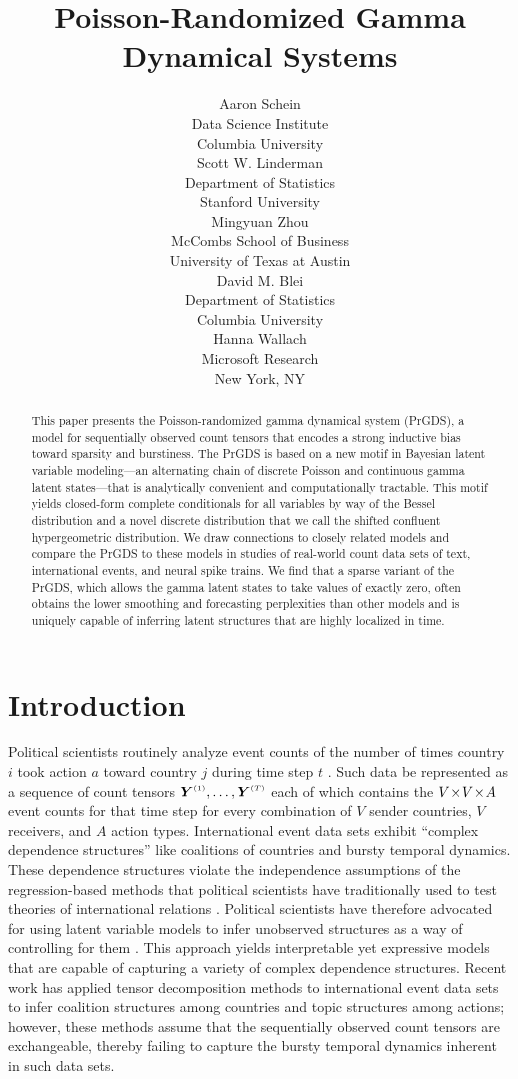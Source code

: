 \documentclass{article}
\title{Poisson-Randomized Gamma Dynamical Systems}
\author{%
  Aaron Schein \\
  Data Science Institute\\
  Columbia University\\
  \And
  Scott W. Linderman \\
  Department of Statistics\\
  Stanford University\\
  \AND
  Mingyuan Zhou \\
  McCombs School of Business\\
  University of Texas at Austin\\
  \And
  David M. Blei \\
  Department of Statistics\\
  Columbia University\\
  \And
  Hanna Wallach \\
  Microsoft Research\\
  New York, NY\\
}
\begin{document}
\maketitle

\begin{abstract}
This paper presents the Poisson-randomized gamma dynamical system (PrGDS), a model for sequentially observed count tensors that encodes a strong inductive bias toward sparsity and burstiness. The PrGDS is based on a new motif in Bayesian latent variable modeling---an alternating chain of discrete Poisson and continuous gamma latent states---that is analytically convenient and computationally tractable. This motif yields closed-form complete conditionals for all variables by way of the Bessel distribution and a novel discrete distribution that we call the shifted confluent hypergeometric distribution. We draw connections to closely related models and compare the PrGDS to these models in studies of real-world count data sets of text, international events, and neural spike trains. We find that a sparse variant of the PrGDS, which allows the gamma latent states to take values of exactly zero, often obtains the lower smoothing and forecasting perplexities than other models and is uniquely capable of inferring latent structures that are highly localized in time.~
\end{abstract}

\section{Introduction}

Political scientists routinely analyze event counts of the number of times country $i$ took action $a$ toward country $j$ during time step $t$ \cite{schrodt1995event}. Such data be represented as a sequence of count tensors $\Yten^{\mathsmaller{(1)}},\dots,\Yten^{\mathsmaller{(T)}}$ each of which contains the $V \!\times\! V \!\times\! A$ event counts for that time step for every combination of $V$ sender countries, $V$ receivers, and $A$ action types. International event data sets exhibit ``complex dependence structures'' \citep{king2001proper} like coalitions of countries and bursty temporal dynamics. These dependence structures violate the independence assumptions of the regression-based methods that political scientists have traditionally used to test theories of international relations \cite{green2001dirty,poast2010mis,erikson2014dyadic}. Political scientists have therefore advocated for using latent variable models to infer unobserved structures as a way of controlling for them \cite{stewart2014latent}. This approach yields interpretable yet expressive models that are capable of capturing a variety of complex dependence structures. Recent work has applied tensor decomposition methods to international event data sets \cite{hoff2004modeling,hoff2015multilinear,schein2015bayesian,hoff2016equivariant,schein2016bayesian} to infer coalition structures among countries and topic structures among actions; however, these methods assume that the sequentially observed count tensors are exchangeable, thereby failing to capture the bursty temporal dynamics inherent in such data sets.~
\end{document}

